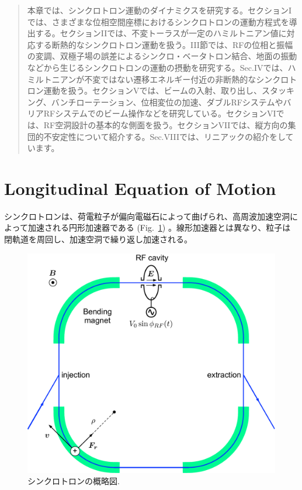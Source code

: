 \documentclass[]{jlreq}
\begin{document}
\begin{abstract}
  本章では、シンクロトロン運動のダイナミクスを研究する。セクションIでは、さまざまな位相空間座標におけるシンクロトロンの運動方程式を導出する。セクションIIでは、不変トーラスが一定のハミルトニアン値に対応する断熱的なシンクロトロン運動を扱う。III節では、RFの位相と振幅の変調、双極子場の誤差によるシンクロ・ベータトロン結合、地面の振動などから生じるシンクロトロンの運動の摂動を研究する。Sec.IVでは、ハミルトニアンが不変ではない遷移エネルギー付近の非断熱的なシンクロトロン運動を扱う。セクションVでは、ビームの入射、取り出し、スタッキング、バンチローテーション、位相変位の加速、ダブルRFシステムやバリアRFシステムでのビーム操作などを研究している。セクションVIでは、RF空洞設計の基本的な側面を扱う。セクションVIIでは、縦方向の集団的不安定性について紹介する。Sec.VIIIでは、リニアックの紹介をしています。
\end{abstract}


\section{Longitudinal Equation of Motion}
シンクロトロンは、荷電粒子が偏向電磁石によって曲げられ、高周波加速空洞によって加速される円形加速器である (Fig.~\ref{synchrotron}) 。線形加速器とは異なり、粒子は閉軌道を周回し、加速空洞で繰り返し加速される。
%
\begin{figure}[hbt]
  \begin{center}
    \includegraphics[width=12cm,clip]{figs/synchrotron.pdf}
    \caption{シンクロトロンの概略図.}
   \label{synchrotron}
  \end{center}
\end{figure}
\end{document}

